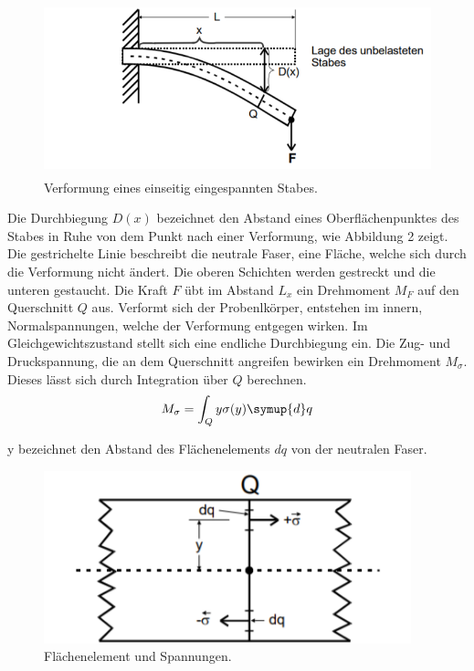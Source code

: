 \begin{figure}[H]
  \centering
  \includegraphics[height=5cm]{einseitigerstab.PNG}
  \caption{Verformung eines einseitig eingespannten Stabes. \cite{sample}}
  \label{fig:einseitigerstab}
\end{figure}

Die Durchbiegung $D(x)$ bezeichnet den Abstand eines Oberflächenpunktes des Stabes
in Ruhe von dem Punkt nach einer Verformung, wie Abbildung 2 zeigt. Die
gestrichelte Linie beschreibt die neutrale Faser, eine Fläche, welche sich durch die Verformung nicht ändert.
Die oberen Schichten werden gestreckt und die unteren gestaucht. Die Kraft $F$
übt im Abstand $L _ x$ ein Drehmoment $M_F$ auf den Querschnitt $Q$ aus. Verformt sich
der Probenlkörper, entstehen im innern, Normalspannungen, welche der Verformung
entgegen wirken. Im Gleichgewichtszustand stellt sich eine endliche Durchbiegung ein.
Die Zug- und Druckspannung, die an dem Querschnitt angreifen bewirken ein Drehmoment $M_{\sigma}$.
Dieses lässt sich durch Integration über $Q$ berechnen.
\begin{equation}
  M_{\sigma} = \int_Q y \sigma(y) \symup{d}q
\end{equation}

y bezeichnet den Abstand des Flächenelements $dq$ von der neutralen Faser.

\begin{figure}[H]
  \centering
  \includegraphics[height=5cm]{stabausschnitt.PNG}
  \caption{Flächenelement und Spannungen. \cite{sample}}
  \label{fig:stabausschnitt}
\end{figure}

